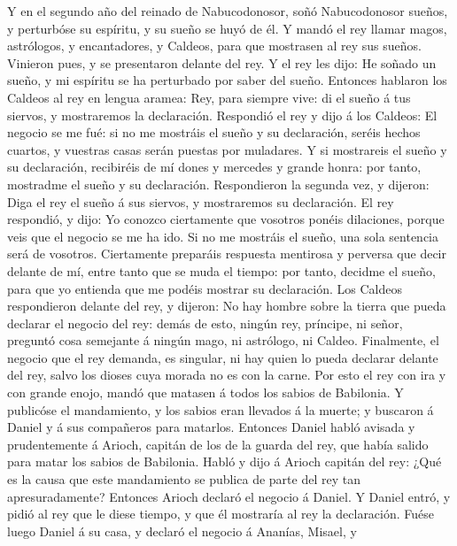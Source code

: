  Y en el segundo año del reinado de Nabucodonosor, soñó
Nabucodonosor sueños, y perturbóse su espíritu, y su sueño se huyó de
él.  Y mandó el rey llamar magos, astrólogos, y
encantadores, y Caldeos, para que mostrasen al rey sus sueños. Vinieron
pues, y se presentaron delante del rey.  Y el rey les dijo:
He soñado un sueño, y mi espíritu se ha perturbado por saber del sueño.
 Entonces hablaron los Caldeos al rey en lengua aramea: Rey,
para siempre vive: di el sueño á tus siervos, y mostraremos la
declaración.  Respondió el rey y dijo á los Caldeos: El
negocio se me fué: si no me mostráis el sueño y su declaración, seréis
hechos cuartos, y vuestras casas serán puestas por muladares.
 Y si mostrareis el sueño y su declaración, recibiréis de mí
dones y mercedes y grande honra: por tanto, mostradme el sueño y su
declaración.  Respondieron la segunda vez, y dijeron: Diga
el rey el sueño á sus siervos, y mostraremos su declaración.
 El rey respondió, y dijo: Yo conozco ciertamente que
vosotros ponéis dilaciones, porque veis que el negocio se me ha ido.
 Si no me mostráis el sueño, una sola sentencia será de
vosotros. Ciertamente preparáis respuesta mentirosa y perversa que decir
delante de mí, entre tanto que se muda el tiempo: por tanto, decidme el
sueño, para que yo entienda que me podéis mostrar su declaración.
 Los Caldeos respondieron delante del rey, y dijeron: No
hay hombre sobre la tierra que pueda declarar el negocio del rey: demás
de esto, ningún rey, príncipe, ni señor, preguntó cosa semejante á
ningún mago, ni astrólogo, ni Caldeo.  Finalmente, el
negocio que el rey demanda, es singular, ni hay quien lo pueda declarar
delante del rey, salvo los dioses cuya morada no es con la carne.
 Por esto el rey con ira y con grande enojo, mandó que
matasen á todos los sabios de Babilonia.  Y publicóse el
mandamiento, y los sabios eran llevados á la muerte; y buscaron á Daniel
y á sus compañeros para matarlos.  Entonces Daniel habló
avisada y prudentemente á Arioch, capitán de los de la guarda del rey,
que había salido para matar los sabios de Babilonia.  Habló
y dijo á Arioch capitán del rey: ¿Qué es la causa que este mandamiento
se publica de parte del rey tan apresuradamente? Entonces Arioch declaró
el negocio á Daniel.  Y Daniel entró, y pidió al rey que le
diese tiempo, y que él mostraría al rey la declaración. 
Fuése luego Daniel á su casa, y declaró el negocio á Ananías, Misael, y
